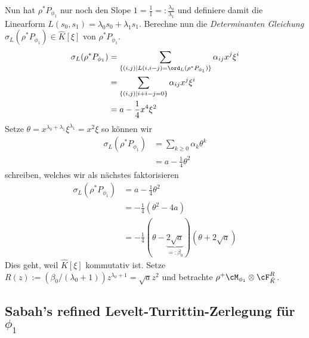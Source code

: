 \begin{comment}
Ab hier nochmal neu / verbessern!\\
wechselt variable t |-> x
\end{comment}
Nun hat $\rho^*P_{\phi_1}$ nur noch den Slope
$1=\frac{1}{1}=:\frac{\lambda_0}{\lambda_1}$ und definiere damit die Linearform
$L(s_0,s_1)=\lambda_0s_0+\lambda_1s_1$.  Berechne nun die \emph{Determinanten
Gleichung} $\sigma_L(\rho^*P_{\phi_1})\in \hat
K[\xi]$ von $\rho^*P_{\phi_1}$.
\begin{align*}
\sigma_L(\rho^*P_{\phi_1})
&= \sum_{\{(i,j) \mid L(i,i-j)=\ord_L(\rho^*P_{\phi_1})\}}\alpha_{ij}x^j\xi^i\\
&= \sum_{\{(i,j) \mid i + i-j=0\}}\alpha_{ij}x^j\xi^i\\
&= a-\frac{1}{4}x^4\xi^2
\end{align*}
Setze $\theta=x^{\lambda_0+\lambda_1}\xi^{\lambda_1}=x^2\xi$ so können wir
\begin{align*}
\sigma_L(\rho^*P_{\phi_1}) &= \sum_{k\geq 0}\alpha_k\theta^k\\
&= a-\frac{1}{4}\theta^2
\end{align*}
schreiben, welches wir als nächstes faktorisieren
\begin{align*}
\sigma_L(\rho^*P_{\phi_1}) &= a-\frac{1}{4}\theta^2\\
&=-\frac{1}{4}(\theta^2-4a)\\
&=-\frac{1}{4}
  (\theta-\underset{=:\beta_0}{\underbrace{2\sqrt{a}}})(\theta+2\sqrt{a})
\end{align*}
Dies geht, weil $\hat K[\xi]$ kommutativ ist.
Setze $R(z):=(\beta_0/(\lambda_0+1))z^{\lambda_0+1}=\sqrt{a}z^2$ und betrachte
$\rho^+\cM_{\phi_1}\otimes\cF_{\hat K}^R$.

\subsection{Sabah's refined Levelt-Turrittin-Zerlegung für $\phi_1$}


